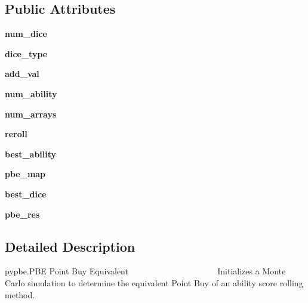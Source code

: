 \subsection*{Public Attributes}
\begin{DoxyCompactItemize}
\item 
\mbox{\label{classpypbe_1_1_p_b_e_a7624d1ac3da3cb3fcf89da5669cb7660}} 
{\bfseries num\+\_\+dice}
\item 
\mbox{\label{classpypbe_1_1_p_b_e_a5007e074da7c722777f41eea45e26ff2}} 
{\bfseries dice\+\_\+type}
\item 
\mbox{\label{classpypbe_1_1_p_b_e_a9f15770c8d7f30f5c5bc9080e1bdfe4f}} 
{\bfseries add\+\_\+val}
\item 
\mbox{\label{classpypbe_1_1_p_b_e_aed6e08f809eb22fb310b5d4ee68436cd}} 
{\bfseries num\+\_\+ability}
\item 
\mbox{\label{classpypbe_1_1_p_b_e_ad027d3e7ccf30e3fdf000cac4060cd41}} 
{\bfseries num\+\_\+arrays}
\item 
\mbox{\label{classpypbe_1_1_p_b_e_ad9b8e799ffc4553d01d23d5444b7078d}} 
{\bfseries reroll}
\item 
\mbox{\label{classpypbe_1_1_p_b_e_aad217eb181f767c2872cea6714c89fea}} 
{\bfseries best\+\_\+ability}
\item 
\mbox{\label{classpypbe_1_1_p_b_e_a1a9b251922693fde671144303d8cf55e}} 
{\bfseries pbe\+\_\+map}
\item 
\mbox{\label{classpypbe_1_1_p_b_e_a2d050fa6237ab33c294c780997c1f8a8}} 
{\bfseries best\+\_\+dice}
\item 
\mbox{\label{classpypbe_1_1_p_b_e_a3b42329623dd1ca342fb30609477c0bf}} 
{\bfseries pbe\+\_\+res}
\end{DoxyCompactItemize}


\subsection{Detailed Description}
\begin{DoxyVerb}pypbe.PBE
Point Buy Equivalent
~~~~~~~~~~~~~~~~~~~~
Initializes a Monte Carlo simulation to determine the equivalent
Point Buy of an ability score rolling method.
\end{DoxyVerb}
 

